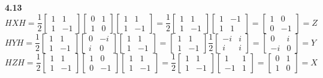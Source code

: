 \textbf{4.13}
\[
HXH = \frac{1}{2}\begin{bmatrix}
    1 & 1 \\
    1 & -1
\end{bmatrix}\begin{bmatrix}
    0 & 1 \\
    1 & 0
\end{bmatrix}
\begin{bmatrix}
    1 & 1 \\
    1 & -1
\end{bmatrix} =\frac{1}{2}\begin{bmatrix}
    1 & 1 \\
    1 & -1
\end{bmatrix} \begin{bmatrix}
    1 & -1 \\
    1 & 1
\end{bmatrix} =\begin{bmatrix}
    1 & 0 \\
    0 & -1
\end{bmatrix} = Z  
\]
\[HYH = \frac{1}{2}\begin{bmatrix}
    1 & 1 \\
    1 & -1
\end{bmatrix}\begin{bmatrix}
    0 &  -i\\
    i & 0
    \end{bmatrix}
\begin{bmatrix}
    1 & 1 \\
    1 & -1
\end{bmatrix}  =\begin{bmatrix}
    1 & 1 \\
    1 & -1
\end{bmatrix}\frac{1}{2}\begin{bmatrix}
    -i & i \\
    i & i
\end{bmatrix}  = \begin{bmatrix}
    0 &  i\\
    -i & 0
\end{bmatrix}=Y\]
\[HZH=\frac{1}{2}\begin{bmatrix}
    1 & 1 \\
    1 & -1
\end{bmatrix}\begin{bmatrix}
    1 &  0\\
    0 & -1
    \end{bmatrix}
\begin{bmatrix}
    1 & 1 \\
    1 & -1
\end{bmatrix}  = \frac{1}{2}\begin{bmatrix}
    1 & 1 \\
    1 & -1
\end{bmatrix}\begin{bmatrix}
    1 & 1 \\
    -1 & 1
\end{bmatrix} =\begin{bmatrix}
    0 & 1 \\
    1 & 0
\end{bmatrix} = X\]

